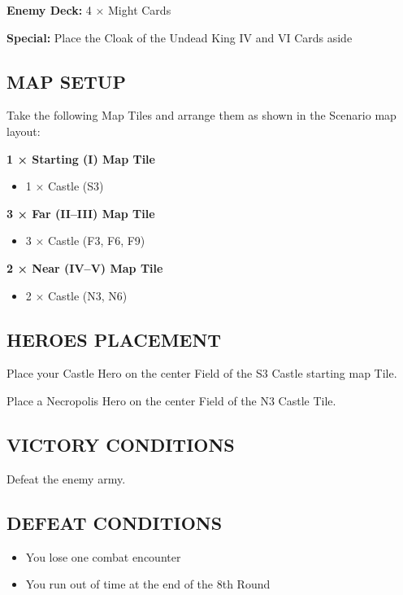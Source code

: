 \begin{multicols*}{2}
\textbf{Enemy Deck:} 4 × Might Cards

\textbf{Special:} Place the Cloak of the Undead King IV and VI Cards aside

\subsection*{\MakeUppercase{Map setup}}

Take the following Map Tiles and arrange them as shown in the Scenario map layout:

\textbf{1 × Starting (I) Map Tile}
\begin{itemize}
    \item 1 × Castle (S3)
\end{itemize}

\textbf{3 × Far (II--III) Map Tile}
\begin{itemize}
    \item 3 × Castle (F3, F6, F9)
\end{itemize}

\textbf{2 × Near (IV--V) Map Tile}
\begin{itemize}
    \item 2 × Castle (N3, N6)
\end{itemize}

\subsection*{\MakeUppercase{Heroes placement}}

Place your Castle Hero on the center Field of the S3 Castle starting map Tile.

Place a Necropolis Hero on the center Field of the N3 Castle Tile.

\subsection*{\MakeUppercase{Victory Conditions}}

Defeat the enemy army.

\subsection*{\MakeUppercase{Defeat Conditions}}
\begin{itemize}
  \item You lose one combat encounter
  \item You run out of time at the end of the 8th Round
\end{itemize}
\end{multicols*}

